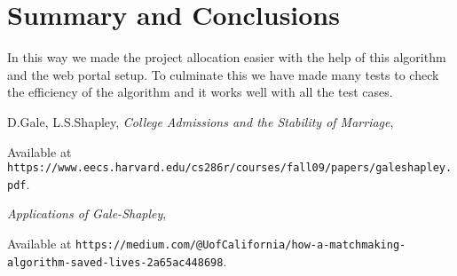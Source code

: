 \documentclass{article}
\begin{document}
\section{Summary and Conclusions}
In this way we made the project allocation easier with the help of this algorithm and the web portal setup. To culminate this we have made many tests to check the efficiency of the algorithm and it works well with all the test cases. 



\begin{thebibliography}{10}

 D.Gale, L.S.Shapley, 
\emph{College Admissions and the Stability of Marriage},


Available at \texttt{https://www.eecs.harvard.edu/cs286r/courses/fall09/papers/galeshapley.pdf}.

\emph{Applications of Gale-Shapley},


Available at \texttt{https://medium.com/@UofCalifornia/how-a-matchmaking-algorithm-saved-lives-2a65ac448698}.


\end{thebibliography}
\end{document}
